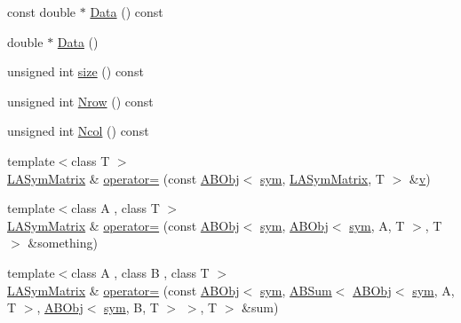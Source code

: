 \begin{DoxyCompactItemize}
const double $\ast$ \mbox{\hyperlink{classROOT_1_1Minuit2_1_1LASymMatrix_ab1fb932a4ad517108a3b58473b6d8803}{Data}} () const
\item 
double $\ast$ \mbox{\hyperlink{classROOT_1_1Minuit2_1_1LASymMatrix_abb2b699b82e6aa2803d01e16683433eb}{Data}} ()
\item 
unsigned int \mbox{\hyperlink{classROOT_1_1Minuit2_1_1LASymMatrix_af924c1e0eb1578716a8cb8940cc08563}{size}} () const
\item 
unsigned int \mbox{\hyperlink{classROOT_1_1Minuit2_1_1LASymMatrix_ac76b44933bc4b144b8671c089b8d7ef5}{Nrow}} () const
\item 
unsigned int \mbox{\hyperlink{classROOT_1_1Minuit2_1_1LASymMatrix_a36bb0f349110a80cb742953ae68fc9c5}{Ncol}} () const
\item 
{\footnotesize template$<$class T $>$ }\\\mbox{\hyperlink{classROOT_1_1Minuit2_1_1LASymMatrix}{L\+A\+Sym\+Matrix}} \& \mbox{\hyperlink{classROOT_1_1Minuit2_1_1LASymMatrix_a6c1a413ac701804116e0e395334edc3b}{operator=}} (const \mbox{\hyperlink{classROOT_1_1Minuit2_1_1ABObj}{A\+B\+Obj}}$<$ \mbox{\hyperlink{classROOT_1_1Minuit2_1_1sym}{sym}}, \mbox{\hyperlink{classROOT_1_1Minuit2_1_1LASymMatrix}{L\+A\+Sym\+Matrix}}, T $>$ \&\mbox{\hyperlink{adat__devel_2lib_2hadron_2hadron__timeslice_8cc_a716fc87f5e814be3ceee2405ed6ff22a}{v}})
\item 
{\footnotesize template$<$class A , class T $>$ }\\\mbox{\hyperlink{classROOT_1_1Minuit2_1_1LASymMatrix}{L\+A\+Sym\+Matrix}} \& \mbox{\hyperlink{classROOT_1_1Minuit2_1_1LASymMatrix_ad9610e3f4b18a52ab16644373e179acc}{operator=}} (const \mbox{\hyperlink{classROOT_1_1Minuit2_1_1ABObj}{A\+B\+Obj}}$<$ \mbox{\hyperlink{classROOT_1_1Minuit2_1_1sym}{sym}}, \mbox{\hyperlink{classROOT_1_1Minuit2_1_1ABObj}{A\+B\+Obj}}$<$ \mbox{\hyperlink{classROOT_1_1Minuit2_1_1sym}{sym}}, A, T $>$, T $>$ \&something)
\item 
{\footnotesize template$<$class A , class B , class T $>$ }\\\mbox{\hyperlink{classROOT_1_1Minuit2_1_1LASymMatrix}{L\+A\+Sym\+Matrix}} \& \mbox{\hyperlink{classROOT_1_1Minuit2_1_1LASymMatrix_a88d40828624a6418f8b94e239e30d322}{operator=}} (const \mbox{\hyperlink{classROOT_1_1Minuit2_1_1ABObj}{A\+B\+Obj}}$<$ \mbox{\hyperlink{classROOT_1_1Minuit2_1_1sym}{sym}}, \mbox{\hyperlink{classROOT_1_1Minuit2_1_1ABSum}{A\+B\+Sum}}$<$ \mbox{\hyperlink{classROOT_1_1Minuit2_1_1ABObj}{A\+B\+Obj}}$<$ \mbox{\hyperlink{classROOT_1_1Minuit2_1_1sym}{sym}}, A, T $>$, \mbox{\hyperlink{classROOT_1_1Minuit2_1_1ABObj}{A\+B\+Obj}}$<$ \mbox{\hyperlink{classROOT_1_1Minuit2_1_1sym}{sym}}, B, T $>$ $>$, T $>$ \&sum)

\end{DoxyCompactItemize}
